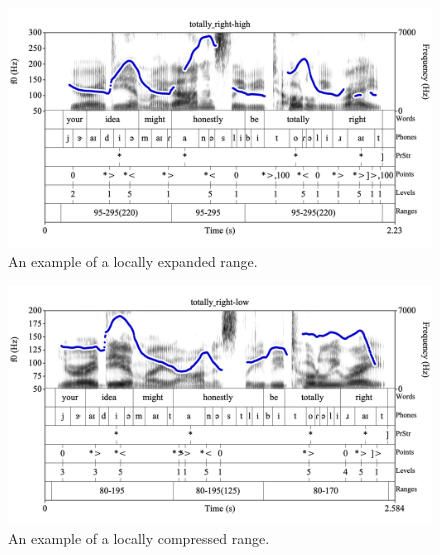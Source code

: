 \documentclass[11pt, twoside]{memoir}
\begin{document}
\begin{figure}[H]
\centering
%
\includegraphics[width=.875\linewidth]{Ranges-totally_right-high-advanced.png}
%
\caption{An example of a locally expanded range.%
\label{fig:totally_right-high Ranges Adv}%
}
\end{figure}

\begin{figure}[H]
\centering
%
\includegraphics[width=.875\linewidth]{Ranges-totally_right-low-advanced.png}
%
\caption{An example of a locally compressed range.%
\label{fig:totally_right-low Ranges Adv}%
}
\end{figure}
\end{document}
